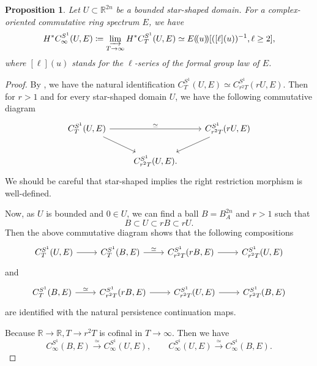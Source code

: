 \documentclass[11pt]{amsart}
\numberwithin{equation}{section}
\theoremstyle{plain}
\newtheorem{Prop}[prop]{Proposition}
\theoremstyle{definition}
\theoremstyle{remark}
\newcommand{\bR} { {\mathbb{R}}}
\newcommand{\fls}[1]{{(\!(#1 )\!) }}
\begin{document}
\begin{Prop}\label{prop: unfiltered CT=SH}Let $U\subset \bR^{2n}$ be a bounded star-shaped domain. For a complex-oriented commutative ring spectrum $E$, we have
\[H^*C_\infty^{S^1}(U,E)\coloneqq \varinjlim_{T\to \infty}H^*C_T^{S^1}(U,E) \simeq E\fls{u}[([\ell](u))^{-1},\ell\geq 2],
\]
where $[\ell](u)$ stands for the $\ell$-series of the formal group law of $E$.
\end{Prop}
\begin{proof}By \cite[Corollary 2.6]{Capacities2021}, we have the natural identification $C^{S^1}_T(U,E) \simeq C^{S^1}_{r^2T}(rU,E)$. Then for $r>1$ and for every star-shaped domain $U$, we have the following commutative diagram 
\[\begin{tikzcd}
{C^{S^1}_T(U,E)} \arrow[rr, "\simeq"] \arrow[rd] &                         & {C^{S^1}_{r^2T}(rU,E)} \arrow[ld] \\
                                                   & {C^{S^1}_{r^2T}(U,E).} &                                    
\end{tikzcd}\]
We should be careful that star-shaped implies the right restriction morphism is well-defined.

Now, as $U$ is bounded and $0\in U$, we can find a ball $B=B^{2n}_A$ and $r>1$ such that 
\[B \subset U \subset rB \subset rU.\]
Then the above commutative diagram shows that the following compositions
\[\begin{tikzcd}{C^{S^1}_T(U,E)} \arrow[r] & {C^{S^1}_T(B,E)} \arrow[r, "\simeq"] & {C^{S^1}_{r^2T}(rB,E)} \arrow[r] & {C^{S^1}_{r^2T}(U,E)}\end{tikzcd}\]
and
\[\begin{tikzcd}
{C^{S^1}_T(B,E)} \arrow[r, "\simeq"] & {C^{S^1}_{r^2T}(rB,E)} \arrow[r] & {C^{S^1}_{r^2T}(U,E)} \arrow[r] & {C^{S^1}_{r^2T}(B,E)}
\end{tikzcd}\]
are identified with the natural persistence continuation maps.

Because $\bR\to \bR,T\to r^2 T$ is cofinal in $T\to \infty$. Then we have
\[C^{S^1}_\infty(B,E)\xrightarrow{\simeq } C^{S^1}_\infty(U,E),\qquad C^{S^1}_\infty(U,E)\xrightarrow{\simeq } C^{S^1}_\infty(B,E).\]


\end{proof}
\end{document}
